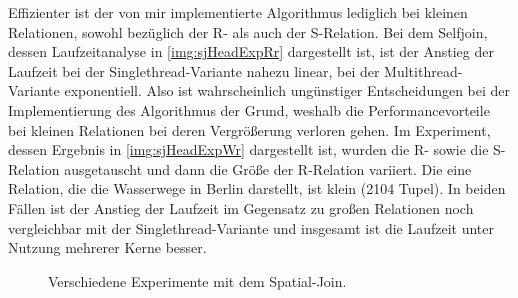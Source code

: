 \documentclass[a4paper,12pt,twoside]{article}
\begin{document}
Effizienter ist der von mir implementierte Algorithmus lediglich bei kleinen Relationen, sowohl bezüglich der R- als auch der S-Relation. Bei dem Selfjoin, dessen Laufzeitanalyse in \autoref{img:sjHeadExpRr} dargestellt ist, ist der Anstieg der Laufzeit bei der Singlethread-Variante nahezu linear, bei der Multithread-Variante exponentiell. Also ist wahrscheinlich ungünstiger Entscheidungen bei der Implementierung des Algorithmus der Grund, weshalb die Performancevorteile bei kleinen Relationen bei deren Vergrößerung verloren gehen. Im Experiment, dessen Ergebnis in \autoref{img:sjHeadExpWr} dargestellt ist, wurden die R- sowie die S-Relation ausgetauscht und dann die Größe der R-Relation variiert. Die eine Relation, die die Wasserwege in Berlin darstellt, ist klein (2104 Tupel). In beiden Fällen ist der Anstieg der Laufzeit im Gegensatz zu großen Relationen noch vergleichbar mit der Singlethread-Variante und insgesamt ist die Laufzeit unter Nutzung mehrerer Kerne besser. 

\begin{figure}
	\centering
	\caption{Verschiedene Experimente mit dem Spatial-Join.}
	\label{img:sjExpAllg}
\end{figure}
\end{document}
